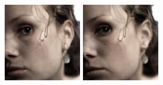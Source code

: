 \begin{figure}[h]
\begin{minipage}{0.15\textwidth}
    \end{minipage}
    \begin{minipage}{0.15\textwidth}
        \centering
        \includegraphics[width=\linewidth]{material/65k/328.png}
    \end{minipage}
    \begin{minipage}{0.15\textwidth}
        \centering
        \includegraphics[width=\linewidth]{material/262k/328.png}
    \end{minipage}


\end{figure}

